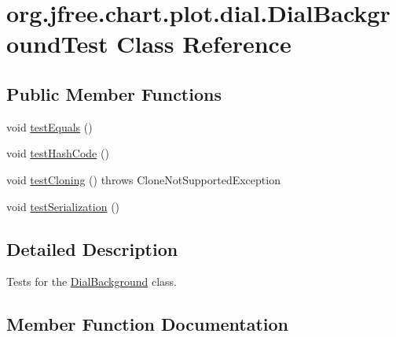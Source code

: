 \hypertarget{classorg_1_1jfree_1_1chart_1_1plot_1_1dial_1_1_dial_background_test}{}\section{org.\+jfree.\+chart.\+plot.\+dial.\+Dial\+Background\+Test Class Reference}
\label{classorg_1_1jfree_1_1chart_1_1plot_1_1dial_1_1_dial_background_test}
\subsection*{Public Member Functions}
\begin{DoxyCompactItemize}
\item 
void \mbox{\hyperlink{classorg_1_1jfree_1_1chart_1_1plot_1_1dial_1_1_dial_background_test_a75e9430127ca129906a7f701352a50c5}{test\+Equals}} ()
\item 
void \mbox{\hyperlink{classorg_1_1jfree_1_1chart_1_1plot_1_1dial_1_1_dial_background_test_a9ddd061fafabeb4a15053c5696462653}{test\+Hash\+Code}} ()
\item 
void \mbox{\hyperlink{classorg_1_1jfree_1_1chart_1_1plot_1_1dial_1_1_dial_background_test_a1e0e885cbb96da74296f49afea46e350}{test\+Cloning}} ()  throws Clone\+Not\+Supported\+Exception 
\item 
void \mbox{\hyperlink{classorg_1_1jfree_1_1chart_1_1plot_1_1dial_1_1_dial_background_test_a4e20f15b87c2c79add1979639218203d}{test\+Serialization}} ()
\end{DoxyCompactItemize}


\subsection{Detailed Description}
Tests for the \mbox{\hyperlink{classorg_1_1jfree_1_1chart_1_1plot_1_1dial_1_1_dial_background}{Dial\+Background}} class. 

\subsection{Member Function Documentation}
\mbox{\label{classorg_1_1jfree_1_1chart_1_1plot_1_1dial_1_1_dial_background_test_a1e0e885cbb96da74296f49afea46e350}} 
